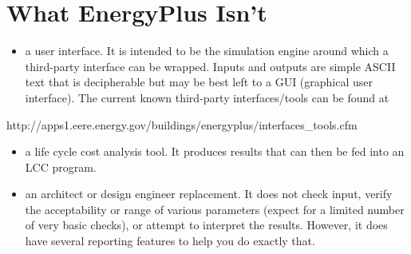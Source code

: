 \section{What EnergyPlus Isn't}\label{what-energyplus-isnt}

\begin{itemize}
\tightlist
\item
  a user interface. It is intended to be the simulation engine around which a third-party interface can be wrapped. Inputs and outputs are simple ASCII text that is decipherable but may be best left to a GUI (graphical user interface). The current known third-party interfaces/tools can be found at
\end{itemize}

http://apps1.eere.energy.gov/buildings/energyplus/interfaces\_tools.cfm

\begin{itemize}
\item
  a life cycle cost analysis tool. It produces results that can then be fed into an LCC program.
\item
  an architect or design engineer replacement. It does not check input, verify the acceptability or range of various parameters (expect for a limited number of very basic checks), or attempt to interpret the results. However, it does have several reporting features to help you do exactly that.
\end{itemize}
